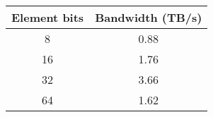 \begin{tabular}{c c}
	Element bits & Bandwidth (TB/s) \\
  \hline
	8  & 0.88 \\
	16 & 1.76 \\
	32 & 3.66 \\
	64 & 1.62 \\
\end{tabular}

